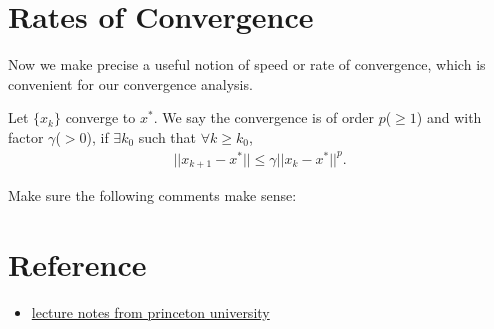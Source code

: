 \section{Rates of Convergence}
Now we make precise a useful notion of speed or rate of convergence, which is convenient for our convergence analysis.

\begin{definition}{}{}
    {
    Let $\{x_k\}$ converge to $x^*$. We say the convergence is of order $p$($\geq 1$) and with factor $\gamma$($>0$), if $\exists k_0$ such that $\forall k\geq k_0$, 
    \begin{align*}
        ||x_{k+1}-x^*|| \leq \gamma || x_k -x^*||^p.
    \end{align*}
    }
\end{definition}
Make sure the following comments make sense:









\section{Reference}
\begin{itemize}
    \item \href{https://www.princeton.edu/~aaa/Public/Teaching/ORF363_COS323/F14/ORF363_COS323_F14_Lec8.pdf}{lecture notes from princeton university}
\end{itemize}